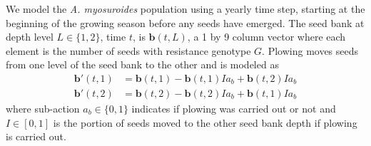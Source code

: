\documentclass[12pt, a4paper]{article}
\begin{document}
We model the \textit{A. myosuroides} population using a yearly time step, starting at the beginning of the growing season before any seeds have emerged. The seed bank at depth level $L \in \{1, 2\}$, time $t$, is $\mathbf{b}(t, L)$, a 1 by 9 column vector where each element is the number of seeds with resistance genotype $G$. Plowing moves seeds from one level of the seed bank to the other and is modeled as
\begin{subequations}
\label{eq:sb_pp}
\begin{align}
	\mathbf{b}'(t, 1) &= \mathbf{b}(t, 1) - \mathbf{b}(t, 1) I a_b + \mathbf{b}(t, 2) I a_b \\
	\mathbf{b}'(t, 2) &= \mathbf{b}(t, 2) - \mathbf{b}(t, 2) I a_b + \mathbf{b}(t, 1) I a_b
\end{align}
\end{subequations} 
where sub-action $a_b \in \{0, 1\}$ indicates if plowing was carried out or not and $I \in [0, 1]$ is the portion of seeds moved to the other seed bank depth if plowing is carried out. 
\end{document}
